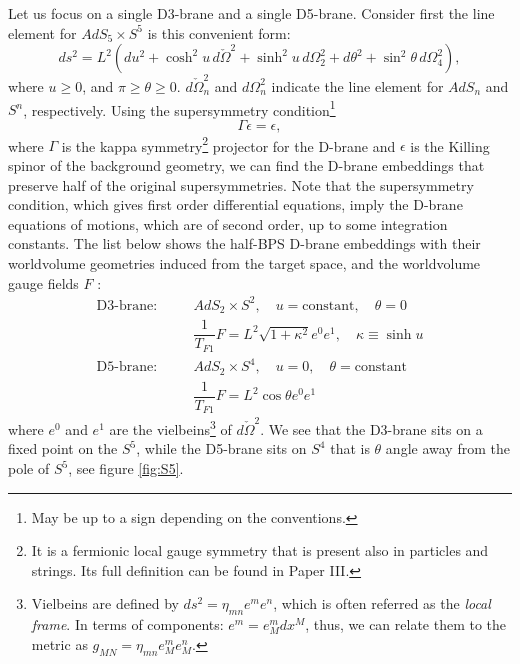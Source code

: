 Let us focus on a single D3-brane and a single D5-brane.
Consider first the line element for $AdS_5\times S^5$ is this convenient form:
\begin{equation}
    ds^2 = L^2 \left( du^2 + \cosh^2 u \,d\check{\Omega}^2  + \sinh^2 u \, d\Omega_2^2 
  + d\theta^2 + \sin^2 \theta \, d\Omega_4^2 \right),
\end{equation}
where $u\geq 0$, and $\pi \geq \theta \geq 0 $. 
$d\check{\Omega}_n^2$ and $d\Omega_n^2$ indicate the line element for $AdS_n$ and $S^n$, respectively.
Using the supersymmetry condition\footnote{
May be up to a sign depending on the conventions.}
\begin{equation}\label{susyCondition}
 \Gamma \epsilon =  \epsilon,
\end{equation}
where $\Gamma$ is the kappa symmetry\footnote{
It is a fermionic local gauge symmetry that is present also in particles and strings. 
Its full definition can be found in Paper III.}
projector for the D-brane and $\epsilon$ is the Killing spinor of the background geometry,
we can find the D-brane embeddings that preserve half of the original supersymmetries. 
Note that the supersymmetry condition, which gives first order differential equations,
imply the D-brane equations of motions, which are of second order, up to some integration constants. 
The list below shows the half-BPS D-brane embeddings with their worldvolume geometries
induced from the target space, and the worldvolume gauge fields $F$ \cite{Yamaguchi:2006tq}:
\begin{eqnarray}
 \text{D3-brane:} &\quad& AdS_2 \times S^2, \quad u=\text{constant}, \quad \theta = 0 \\
		  &\quad& \dfrac{1}{T_{F1}}F = L^2\sqrt{1+\kappa^2} e^0 e^1, \quad \kappa \equiv \sinh u \\
 \text{D5-brane:} &\quad& AdS_2 \times S^4, \quad u=0, \quad \theta = \text{constant} \\
 		  &\quad& \dfrac{1}{T_{F1}}F = L^2 \cos \theta e^0 e^1 
\end{eqnarray}
where $e^0$ and $e^1$ are the vielbeins\footnote{
Vielbeins are defined by $ds^2=\eta_{mn} e^m e^n$, which is often referred as the \emph{local frame}.
In terms of components: $e^m=e^m_M dx^M$, thus, we can relate them to the metric as $g_{MN} = \eta_{mn} e^m_M e^n_M$.} 
of $d\check{\Omega}^2$. 
We see that the D3-brane sits on a fixed point on the $S^5$, 
while the D5-brane sits on $S^4$ that is $\theta$ angle away from the pole of $S^5$, see figure \ref{fig:S5}.


